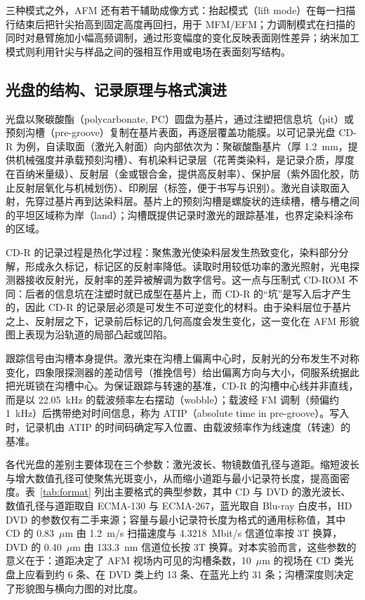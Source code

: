 \documentclass[12pt,a4paper,fontset=windows]{ctexart}
\begin{document}
三种模式之外，AFM 还有若干辅助成像方式：抬起模式（lift mode）在每一扫描行结束后把针尖抬高到固定高度再回扫，用于 MFM/EFM；力调制模式在扫描的同时对悬臂施加小幅高频调制，通过形变幅度的变化反映表面刚性差异；纳米加工模式则利用针尖与样品之间的强相互作用或电场在表面刻写结构\cite{manual_cspm}。

\subsection{光盘的结构、记录原理与格式演进}

光盘以聚碳酸酯（polycarbonate, PC）圆盘为基片，通过注塑把信息坑（pit）或预刻沟槽（pre-groove）复制在基片表面，再逐层覆盖功能膜。以可记录光盘 CD-R 为例，自读取面（激光入射面）向内部依次为：聚碳酸酯基片（厚 1.2~mm，提供机械强度并承载预刻沟槽）、有机染料记录层（花菁类染料，是记录介质，厚度在百纳米量级\cite{kim1997}）、反射层（金或银合金，提供高反射率）、保护层（紫外固化胶，防止反射层氧化与机械划伤）、印刷层（标签，便于书写与识别）。激光自读取面入射，先穿过基片再到达染料层。基片上的预刻沟槽是螺旋状的连续槽，槽与槽之间的平坦区域称为岸（land）；沟槽既提供记录时激光的跟踪基准，也界定染料涂布的区域。

CD-R 的记录过程是热化学过程\cite{kim1997}：聚焦激光使染料层发生热致变化，染料部分分解，形成永久标记，标记区的反射率降低。读取时用较低功率的激光照射，光电探测器接收反射光，反射率的差异被解调为数字信号。这一点与压制式 CD-ROM 不同：后者的信息坑在注塑时就已成型在基片上，而 CD-R 的“坑”是写入后才产生的，因此 CD-R 的记录层必须是可发生不可逆变化的材料。由于染料层位于基片之上、反射层之下，记录前后标记的几何高度会发生变化，这一变化在 AFM 形貌图上表现为沿轨道的局部凸起或凹陷。

跟踪信号由沟槽本身提供。激光束在沟槽上偏离中心时，反射光的分布发生不对称变化，四象限探测器的差动信号（推挽信号）给出偏离方向与大小，伺服系统据此把光斑锁在沟槽中心。为保证跟踪与转速的基准，CD-R 的沟槽中心线并非直线，而是以 22.05~kHz 的载波频率左右摆动（wobble）；载波经 FM 调制（频偏约 1~kHz）后携带绝对时间信息，称为 ATIP（absolute time in pre-groove）。写入时，记录机由 ATIP 的时间码确定写入位置、由载波频率作为线速度（转速）的基准\cite{ecma394}。

各代光盘的差别主要体现在三个参数：激光波长、物镜数值孔径与道距。缩短波长与增大数值孔径可使聚焦光斑变小，从而缩小道距与最小记录符长度，提高面密度。表~\ref{tab:format} 列出主要格式的典型参数，其中 CD 与 DVD 的激光波长、数值孔径与道距取自 ECMA-130 与 ECMA-267，蓝光取自 Blu-ray 白皮书，HD DVD 的参数仅有二手来源；容量与最小记录符长度为格式的通用标称值，其中 CD 的 0.83~$\mu$m 由 1.2~m/s 扫描速度与 4.3218~Mbit/s 信道位率按 3T 换算，DVD 的 0.40~$\mu$m 由 133.3~nm 信道位长按 3T 换算\cite{ecma130,ecma267,bda2004}。对本实验而言，这些参数的意义在于：道距决定了 AFM 视场内可见的沟槽条数，10~$\mu$m 的视场在 CD 类光盘上应看到约 6 条、在 DVD 类上约 13 条、在蓝光上约 31 条；沟槽深度则决定了形貌图与横向力图的对比度。
\end{document}

